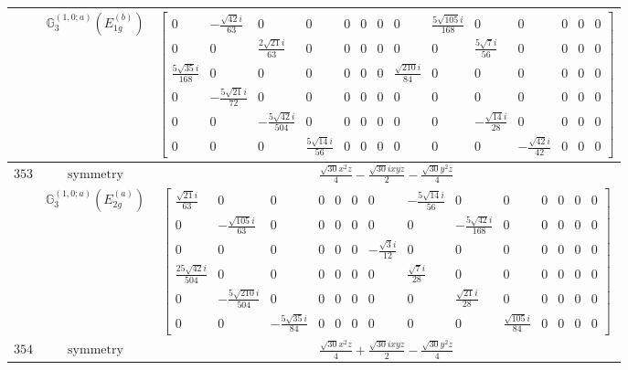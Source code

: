 \documentclass[fleqn,8pt,landscape]{jsarticle}
\begin{document}
\begin{longtable}{ccc}
$  $ & $ \mathbb{G}_{3}^{(1,0;a)}(E_{1g}^{(b)}) $ & $ \begin{bmatrix} 0 & - \frac{\sqrt{42} i}{63} & 0 & 0 & 0 & 0 & 0 & 0 & \frac{5 \sqrt{105} i}{168} & 0 & 0 & 0 & 0 & 0 \\ 0 & 0 & \frac{2 \sqrt{21} i}{63} & 0 & 0 & 0 & 0 & 0 & 0 & \frac{5 \sqrt{7} i}{56} & 0 & 0 & 0 & 0 \\ \frac{5 \sqrt{35} i}{168} & 0 & 0 & 0 & 0 & 0 & 0 & \frac{\sqrt{210} i}{84} & 0 & 0 & 0 & 0 & 0 & 0 \\ 0 & - \frac{5 \sqrt{21} i}{72} & 0 & 0 & 0 & 0 & 0 & 0 & 0 & 0 & 0 & 0 & 0 & 0 \\ 0 & 0 & - \frac{5 \sqrt{42} i}{504} & 0 & 0 & 0 & 0 & 0 & 0 & - \frac{\sqrt{14} i}{28} & 0 & 0 & 0 & 0 \\ 0 & 0 & 0 & \frac{5 \sqrt{14} i}{56} & 0 & 0 & 0 & 0 & 0 & 0 & - \frac{\sqrt{42} i}{42} & 0 & 0 & 0 \end{bmatrix} $ \\ \hline
$ 353 $ & $ \text{symmetry} $ & $ \frac{\sqrt{30} x^{2} z}{4} - \frac{\sqrt{30} i x y z}{2} - \frac{\sqrt{30} y^{2} z}{4} $ \\
$  $ & $ \mathbb{G}_{3}^{(1,0;a)}(E_{2g}^{(a)}) $ & $ \begin{bmatrix} \frac{\sqrt{21} i}{63} & 0 & 0 & 0 & 0 & 0 & 0 & - \frac{5 \sqrt{14} i}{56} & 0 & 0 & 0 & 0 & 0 & 0 \\ 0 & - \frac{\sqrt{105} i}{63} & 0 & 0 & 0 & 0 & 0 & 0 & - \frac{5 \sqrt{42} i}{168} & 0 & 0 & 0 & 0 & 0 \\ 0 & 0 & 0 & 0 & 0 & 0 & - \frac{\sqrt{3} i}{12} & 0 & 0 & 0 & 0 & 0 & 0 & 0 \\ \frac{25 \sqrt{42} i}{504} & 0 & 0 & 0 & 0 & 0 & 0 & \frac{\sqrt{7} i}{28} & 0 & 0 & 0 & 0 & 0 & 0 \\ 0 & - \frac{5 \sqrt{210} i}{504} & 0 & 0 & 0 & 0 & 0 & 0 & \frac{\sqrt{21} i}{28} & 0 & 0 & 0 & 0 & 0 \\ 0 & 0 & - \frac{5 \sqrt{35} i}{84} & 0 & 0 & 0 & 0 & 0 & 0 & \frac{\sqrt{105} i}{84} & 0 & 0 & 0 & 0 \end{bmatrix} $ \\ \hline
$ 354 $ & $ \text{symmetry} $ & $ \frac{\sqrt{30} x^{2} z}{4} + \frac{\sqrt{30} i x y z}{2} - \frac{\sqrt{30} y^{2} z}{4} $ \\

\end{longtable}
\end{document}
